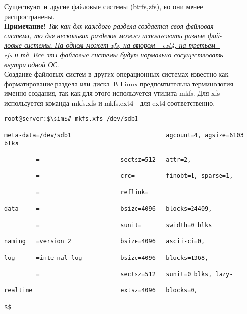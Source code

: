 \documentclass[14pt, a4paper]{article}
\begin{document}
Существуют и другие файловые системы (btrfs,zfs), но они менее распространены.\\

\textbf{Примечание!} \underline{\textit{Так как для каждого раздела создается своя файловая}}\\
\underline{\textit{система, то для нескольких разделов можно использовать разные фай-}} \\
\underline{\textit{ловые системы. На одном может xfs, на втором - ext4, на третьем - }}\\
\underline{\textit{zfs и тд. Все эти файловые системы будут нормально сосуществовать}} \\
\underline{\textit{внутри одной ОС}}.\\

Создание файловых систем в других операционных системах известно как форматирование раздела
или диска. В Linux предпочтительна терминология именно создания, так как для этого используется
утилита \colorbox{backcolour}{mkfs}. Для \colorbox{backcolour}{xfs} используется команда \colorbox{backcolour}{mkfs.xfs} и \colorbox{backcolour}{mkfs.ext4} - для ext4 соответственно.

\vspace{0.3cm}

\begin{lstlisting}
root@server:$\sim$# mkfs.xfs /dev/sdb1

meta-data=/dev/sdb1                           agcount=4, agsize=6103 blks

         =                       sectsz=512   attr=2,

         =                       crc=         finobt=1, sparse=1,

         =                       reflink=

data     =                       bsize=4096   blocks=24409,

         =                       sunit=       swidth=0 blks

naming   =version 2              bsize=4096   ascii-ci=0,

log      =internal log           bsize=4096   blocks=1368,

         =                       sectsz=512   sunit=0 blks, lazy-
         
realtime                         extsz=4096   blocks=0,

$$

\end{lstlisting}
\end{document}
